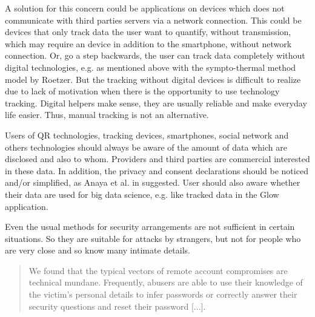 A solution for this concern could be applications on devices which does not communicate with third parties servers via a network connection. This could be devices that only track data the user want to quantify, without transmission, which may require an device in addition to the smartphone, without network connection.
Or, go a step backwards, the user can track data completely without digital technologies, e.g. as mentioned above with the sympto-thermal method model by Roetzer.
But the tracking without digital devices is difficult to realize due to lack of motivation when there is the opportunity to use technology tracking. Digital helpers make sense, they are usually reliable and make everyday life easier. Thus, manual tracking is not an alternative.

Users of \acs{QR} technologies, tracking devices, smartphones, social network and others technologies should always be aware of the amount of data which are disclosed and also to whom. Providers and third parties are commercial interested in these data. In addition, the privacy and consent declarations should be noticed and/or simplified, as Anaya et al. in \cite{anaya2018ethical} suggested.
User should also aware whether their data are used for big data science, e.g. like tracked data in the Glow application.


Even the usual methods for security arrangements are not sufficient in certain situations. So they are suitable for attacks by strangers, but not for people who are very close and so know many intimate details.
\begin{quote}
	We found that the typical vectors of remote account compromises are technical mundane. Frequently, abusers are able to use their knowledge of the victim's personal details to infer passwords or correctly answer their security questions and reset their password [...]. \cite{freed2018stalker}
\end{quote}
